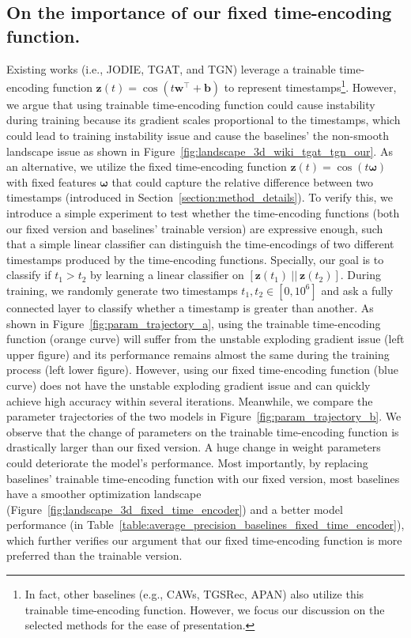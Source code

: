
\subsection{On the importance of our fixed time-encoding function.} \label{section:time_encoder}

Existing works (i.e., JODIE, TGAT, and TGN) leverage a trainable time-encoding function $\mathbf{z}(t) = \cos(t \mathbf{w}^\top + \mathbf{b})$ to represent timestamps\footnote{In fact, other baselines (e.g., CAWs, TGSRec, APAN) also utilize this trainable time-encoding function. However, we focus our discussion on the selected methods for the ease of presentation.}. 
However, we argue that using trainable time-encoding function could cause instability during training because its gradient  scales proportional to the timestamps, which could lead to training instability issue and cause the baselines' the non-smooth landscape issue as shown in Figure~\ref{fig:landscape_3d_wiki_tgat_tgn_our}. 
As an alternative, we utilize the fixed time-encoding function $\mathbf{z}(t)=\cos(t\boldsymbol{\omega})$ with fixed features $\boldsymbol{\omega}$ that could capture the relative difference between two timestamps (introduced in Section~\ref{section:method_details}).
To verify this, we introduce a simple experiment to test whether the time-encoding functions (both our fixed version and baselines' trainable version) are expressive enough, such that a simple linear classifier can distinguish the time-encodings of two different timestamps produced by the time-encoding functions. Specially, our goal is to classify if $t_1>t_2$ by learning a linear classifier on $[\mathbf{z}(t_1)~||~\mathbf{z}(t_2)]$. During training, we randomly generate two timestamps $t_1, t_2\in[0,10^6]$ and ask a fully connected layer to classify whether a timestamp is greater than another.
As shown in Figure~\ref{fig:param_trajectory_a}, using the trainable time-encoding function (orange curve) will suffer from the unstable exploding gradient issue (left upper figure) and its performance remains almost the same during the training process (left lower figure). However, using our fixed time-encoding function (blue curve) does not have the unstable exploding gradient issue and can quickly achieve high accuracy within several iterations. Meanwhile, we compare the parameter trajectories of the two models in Figure~\ref{fig:param_trajectory_b}. We observe that the change of parameters on the trainable time-encoding function is drastically larger than our fixed version. A huge change in weight parameters could deteriorate the model's performance.
Most importantly, by replacing baselines' trainable time-encoding function with our fixed version, most baselines have a smoother optimization landscape (Figure~\ref{fig:landscape_3d_fixed_time_encoder}) and a better model performance (in Table~\ref{table:average_precision_baselines_fixed_time_encoder}), which further verifies our argument that our fixed time-encoding function is more preferred than the trainable version.

